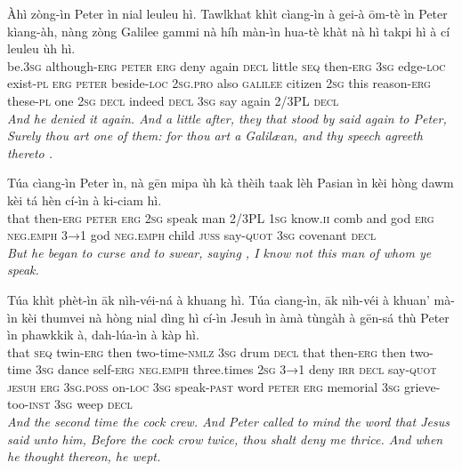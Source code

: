 \documentclass[11pt,a4paper]{article}
\begin{document}
\begin{exe}
\gll Àhì zòng-ìn Peter ìn nial leuleu hì. Tawlkhat khìt cìang-ìn à gei-à ōm-tè ìn Peter kìang-àh, nàng zòng Galilee gammi nà híh màn-ìn hua-tè khàt nà hì takpi hì à cí leuleu ùh hì. \\
     be.\textsc{3sg} although-\textsc{erg} \textsc{peter} \textsc{erg} deny again \textsc{decl} little \textsc{seq} then-\textsc{erg} \textsc{3sg} edge-\textsc{loc} exist-\textsc{pl} \textsc{erg} \textsc{peter} beside-\textsc{loc} \textsc{2sg}.\textsc{pro} also \textsc{galilee} citizen \textsc{2sg} this reason-\textsc{erg} these-\textsc{pl} one \textsc{2sg} \textsc{decl} indeed \textsc{decl} \textsc{3sg} say again 2/3PL \textsc{decl} \\
\glt \textcolor{kjvcolor}{\textit{And he denied it again. And a little after, they that stood by said again to Peter, Surely thou art one of them: for thou art a Galilæan, and thy speech agreeth thereto .}}

\gll Túa cìang-ìn Peter ìn, nà gēn mipa ùh kà thèih taak lèh Pasian ìn kèi hòng dawm kèi tá hèn cí-ìn à ki-ciam hì. \\
     that then-\textsc{erg} \textsc{peter} \textsc{erg} \textsc{2sg} speak man 2/3PL \textsc{1sg} know.\textsc{ii} comb and god \textsc{erg} \textsc{neg}.\textsc{emph} \textsc{3→1} god \textsc{neg}.\textsc{emph} child \textsc{juss} say-\textsc{quot} \textsc{3sg} covenant \textsc{decl} \\
\glt \textcolor{kjvcolor}{\textit{But he began to curse and to swear, saying , I know not this man of whom ye speak.}}

\gll Túa khìt phèt-ìn āk nìh-véi-ná à khuang hì. Túa cìang-ìn, āk nìh-véi à khuan' mà-ìn kèi thumvei nà hòng nial dìng hì cí-ìn Jesuh ìn àmà tùngàh à gēn-sá thù Peter ìn phawkkik à, dah-lúa-ìn à kàp hì. \\
     that \textsc{seq} twin-\textsc{erg} then two-time-\textsc{nmlz} \textsc{3sg} drum \textsc{decl} that then-\textsc{erg} then two-time \textsc{3sg} dance self-\textsc{erg} \textsc{neg}.\textsc{emph} three.times \textsc{2sg} \textsc{3→1} deny \textsc{irr} \textsc{decl} say-\textsc{quot} \textsc{jesuh} \textsc{erg} \textsc{3sg}.\textsc{poss} on-\textsc{loc} \textsc{3sg} speak-\textsc{past} word \textsc{peter} \textsc{erg} memorial \textsc{3sg} grieve-too-\textsc{inst} \textsc{3sg} weep \textsc{decl} \\
\glt \textcolor{kjvcolor}{\textit{And the second time the cock crew. And Peter called to mind the word that Jesus said unto him, Before the cock crow twice, thou shalt deny me thrice. And when he thought thereon, he wept.}}

\end{exe}
\newpage
\end{document}
